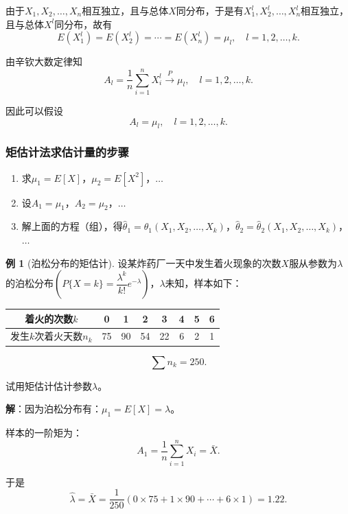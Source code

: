 \documentclass[11pt,a4paper]{report}
\theoremstyle{definition}
\newtheorem{example}{例}[chapter]
\begin{document}
由于$X_{1},X_{2},\ldots,X_{n}$相互独立，且与总体$X$同分布，于是有$X_{1}^{l},X_{2}^{l},\ldots,X_{n}^{l}$相互独立，且与总体$X^{l}$同分布，故有
\[
E(X_{1}^{l})=E(X_{2}^{l})=\cdots=E(X_{n}^{l})=\mu_{l},\quad l=1,2,\ldots,k.
\]

由辛钦大数定律知
\[
A_{l}=\frac{1}{n}\sum_{i=1}^{n}X_{i}^{l}\stackrel{P}{\longrightarrow}\mu_{l},\quad l=1,2,\ldots,k.
\]

因此可以假设
\[
A_{l}=\mu_{l},\quad l=1,2,\ldots,k.
\]

\subsubsection*{矩估计法求估计量的步骤}

\begin{enumerate}[label=\arabic*.,leftmargin=2em]
    \item 求$\mu_{1}=E[X]$，$\mu_{2}=E[X^{2}]$，$\ldots$
    \item 设$A_{1}=\mu_{1}$，$A_{2}=\mu_{2}$，$\ldots$
    \item 解上面的方程（组），得$\hat{\theta}_{1}=\hat{\theta}_{1}(X_{1},X_{2},\ldots,X_{k})$，$\hat{\theta}_{2}=\hat{\theta}_{2}(X_{1},X_{2},\ldots,X_{k})$，$\ldots$
\end{enumerate}

\begin{example}[泊松分布的矩估计]
设某炸药厂一天中发生着火现象的次数$X$服从参数为$\lambda$的泊松分布$\left(P\{X=k\}=\dfrac{\lambda^{k}}{k!}e^{-\lambda}\right)$，$\lambda$未知，样本如下：

\begin{table}[htbp]
\centering
\begin{tabular}{@{}cccccccc@{}}
\toprule
着火的次数$k$ & 0 & 1 & 2 & 3 & 4 & 5 & 6 \\
\midrule
发生$k$次着火天数$n_{k}$ & 75 & 90 & 54 & 22 & 6 & 2 & 1 \\
\bottomrule
\end{tabular}
\end{table}
\[
\sum n_{k}=250.
\]

试用矩估计估计参数$\lambda$。

\textbf{解}：因为泊松分布有：$\mu_{1}=E[X]=\lambda$。

样本的一阶矩为：
\[
A_{1}=\frac{1}{n}\sum_{i=1}^{n}X_{i}=\bar{X}.
\]

于是
\[
\hat{\lambda}=\bar{X}=\frac{1}{250}\left(0\times75+1\times90+\cdots+6\times1\right)=1.22.
\]
\end{example}
\end{document}
